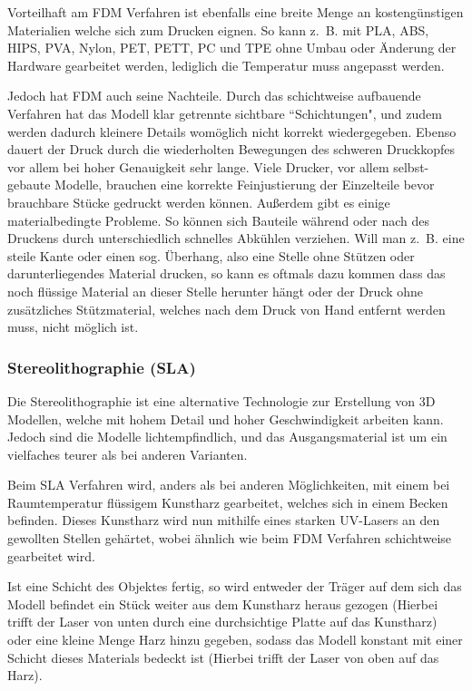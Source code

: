 Vorteilhaft am FDM Verfahren ist ebenfalls eine breite Menge an kostengünstigen Materialien welche sich zum Drucken eignen. So kann z.~B. mit PLA, ABS, HIPS, PVA, Nylon, PET, PETT, PC und TPE \parencite{MATERIALS} ohne Umbau oder Änderung der Hardware gearbeitet werden, lediglich die Temperatur muss angepasst werden.

Jedoch hat FDM auch seine Nachteile.
Durch das schichtweise aufbauende Verfahren hat das Modell klar getrennte sichtbare \textquotedblleft Schichtungen", und zudem werden dadurch kleinere Details womöglich nicht korrekt wiedergegeben. Ebenso dauert der Druck durch die wiederholten Bewegungen des schweren Druckkopfes vor allem bei hoher Genauigkeit sehr lange. Viele Drucker, vor allem selbst-gebaute Modelle, brauchen eine korrekte Feinjustierung der Einzelteile bevor brauchbare Stücke gedruckt werden können. Außerdem gibt es einige materialbedingte Probleme. So können sich Bauteile während oder nach des Druckens durch unterschiedlich schnelles Abkühlen verziehen. Will man z.~B. eine steile Kante oder einen sog. Überhang, also eine Stelle ohne Stützen oder darunterliegendes Material drucken, so kann es oftmals dazu kommen dass das noch flüssige Material an dieser Stelle herunter hängt oder der Druck ohne zusätzliches Stützmaterial, welches nach dem Druck von Hand entfernt werden muss, nicht möglich ist. \parencite[Informationen aus:][]{FDMDetail,DRUCKVERFAHREN}

\subsubsection{Stereolithographie (SLA)}

Die Stereolithographie ist eine alternative Technologie zur Erstellung von 3D Modellen, welche mit hohem Detail und hoher Geschwindigkeit arbeiten kann. Jedoch sind die Modelle lichtempfindlich, und das Ausgangsmaterial ist um ein vielfaches teurer als bei anderen Varianten.

Beim SLA Verfahren wird, anders als bei anderen Möglichkeiten, mit einem bei Raumtemperatur flüssigem Kunstharz gearbeitet, welches sich in einem Becken befinden.
Dieses Kunstharz wird nun mithilfe eines starken UV-Lasers an den gewollten Stellen gehärtet, wobei ähnlich wie beim FDM Verfahren schichtweise gearbeitet wird.

Ist eine Schicht des Objektes fertig, so wird entweder der Träger auf dem sich das Modell befindet ein Stück weiter aus dem Kunstharz heraus gezogen (Hierbei trifft der Laser von unten durch eine durchsichtige Platte auf das Kunstharz) oder eine kleine Menge Harz hinzu gegeben, sodass das Modell konstant mit einer Schicht dieses Materials bedeckt ist (Hierbei trifft der Laser von oben auf das Harz).

